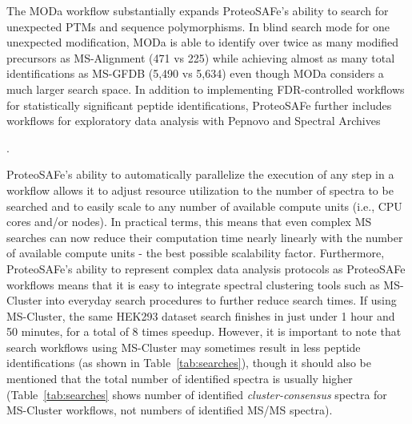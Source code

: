 \documentclass[arial,11pt]{article}
\newcommand{\SF}[1]{\textsf{#1}}
\newcommand{\SYSTEM}[0]{\SF{ProteoSAFe}\xspace}
\begin{document}
The MODa workflow substantially expands \SYSTEM's ability to search for unexpected PTMs and sequence polymorphisms. In blind search mode for one unexpected modification, MODa is able to identify over twice as many modified precursors as MS-Alignment (471 vs 225) while achieving almost as many total identifications as MS-GFDB (5,490 vs 5,634) even though MODa considers a much larger search space.
In addition to implementing FDR-controlled workflows for statistically significant peptide identifications, \SYSTEM further includes workflows for exploratory data analysis with Pepnovo  and  Spectral Archives

.

\SYSTEM's ability to automatically parallelize the execution of any step in a workflow allows it to adjust resource utilization to the number of  spectra to be searched and to easily scale to any number of available compute units (i.e., CPU cores and/or nodes). In practical terms, this means that even complex MS searches can now reduce their computation time nearly linearly with the number of available compute units - the best possible scalability factor.
Furthermore, \SYSTEM's ability to represent complex data analysis protocols as \SYSTEM workflows means that it is easy to integrate spectral clustering tools such as MS-Cluster into everyday search procedures to further reduce search times. If using MS-Cluster, the same HEK293 dataset search finishes in just under 1 hour and 50 minutes, for a total of 8 times speedup. However, it is important to note that search workflows using MS-Cluster may sometimes result in less peptide identifications (as shown in Table~\ref{tab:searches}), though it should also be mentioned that the total number of identified spectra is usually higher (Table~\ref{tab:searches} shows number of identified {\em cluster-consensus} spectra for MS-Cluster workflows, not numbers of identified MS/MS spectra).
\end{document}
